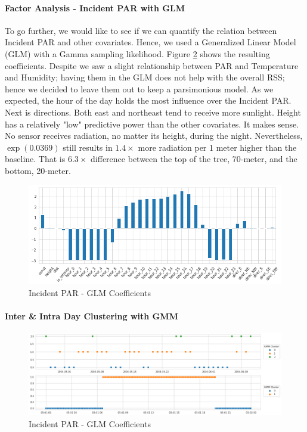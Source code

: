\documentclass[11pt, letterpaper]{article}
\begin{document}
\paragraph{Factor Analysis - Incident PAR with GLM}
To go further, we would like to see if we can quantify the relation between Incident PAR and other covariates. Hence, we used a Generalized Linear Model (GLM) with a Gamma sampling likelihood. Figure \ref{fig:glm_coef} shows the resulting coefficients. Despite we saw a slight relationship between PAR and Temperature and Humidity; having them in the GLM does not help with the overall RSS; hence we decided to leave them out to keep a parsimonious model. As we expected, the hour of the day holds the most influence over the Incident PAR. Next is directions. Both east and northeast tend to receive more sunlight. Height has a relatively "low" predictive power than the other covariates. It makes sense. No sensor receives radiation, no matter its height, during the night. Nevertheless, $\exp(0.0369)$ still results in $1.4\times$ more radiation per 1 meter higher than the baseline. That is $6.3\times$ difference between the top of the tree, 70-meter, and the bottom, 20-meter.
\begin{figure}[h!]
\centering
\includegraphics[width=1.0\textwidth]{eda_3.5.png}
\captionsetup{justification=centering}
\caption{Incident PAR - GLM Coefficients}
\label{fig:glm_coef}
\end{figure}

\paragraph{Inter \& Intra Day Clustering with GMM}
\begin{figure}[h!]
\centering
\includegraphics[width=1.0\textwidth]{if_4.3.png}
\captionsetup{justification=centering}
\caption{Incident PAR - GLM Coefficients}
\label{fig:glm_coef}
\end{figure}
\end{document}
